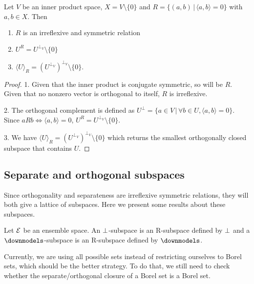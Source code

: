 \begin{mathSection}
	\begin{prop}
		Let $V$ be an inner product space, $X = V \setminus \{0\}$ and $R = \{(a,b) \,|\, \langle a , b\rangle = 0\}$ with $a,b \in X$. Then
		\begin{enumerate}
			\item $R$ is an irreflexive and symmetric relation
			\item $U^{R} = U^{\perp_V} \setminus \{0\}$
			\item $\langle U \rangle_R = (U^{\perp_V})^{\perp_V} \setminus \{0\}$.
		\end{enumerate}
	\end{prop}
	
	\begin{proof}
		1. Given that the inner product is conjugate symmetric, so will be $R$. Given that no nonzero vector is orthogonal to itself, $R$ is irreflexive.
		
		2. The orthogonal complement is defined as $U^\perp = \{ a \in V \, | \, \forall b \in U, \langle a , b\rangle = 0 \}$. Since $aRb \iff \langle a , b\rangle = 0$, $U^{R} = U^{\perp_V} \setminus \{0\}$.
		
		3. We have $\langle U \rangle_R = (U^{\perp_V})^{\perp_V} \setminus \{0\}$ which returns the smallest orthogonally closed subspace that contains $U$.
	\end{proof}
\end{mathSection}

\subsection{Separate and orthogonal subspaces}

Since orthogonality and separateness are irreflexive symmetric relations, they will both give a lattice of subspaces. Here we present some results about these subspaces.

\begin{mathSection}
\begin{defn}
	Let $\mathcal{E}$ be an ensemble space. An $\perp$-subspace is an R-subspace defined by $\perp$ and a $\separate$-subspace is an R-subspace defined by $\separate$.
\end{defn}
\end{mathSection}

Currently, we are using all possible sets instead of restricting ourselves to Borel sets, which should be the better strategy. To do that, we still need to check whether the separate/orthogonal closure of a Borel set is a Borel set.

